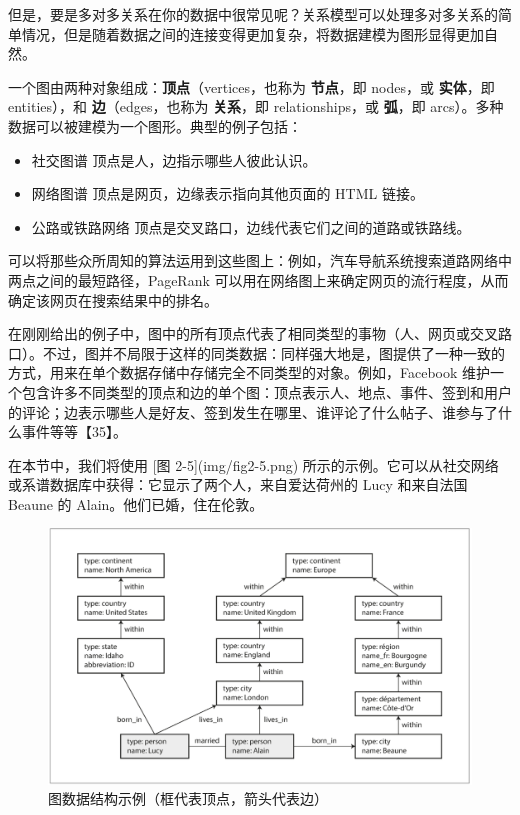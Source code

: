 但是，要是多对多关系在你的数据中很常见呢？关系模型可以处理多对多关系的简单情况，但是随着数据之间的连接变得更加复杂，将数据建模为图形显得更加自然。

一个图由两种对象组成：\textbf{顶点}（vertices，也称为 \textbf{节点}，即 nodes，或 \textbf{实体}，即 entities），和 \textbf{边}（edges，也称为 \textbf{关系}，即 relationships，或 \textbf{弧}，即 arcs）。多种数据可以被建模为一个图形。典型的例子包括：

\begin{itemize}
    \item 社交图谱
    顶点是人，边指示哪些人彼此认识。
    \item 网络图谱
    顶点是网页，边缘表示指向其他页面的 HTML 链接。
    \item 公路或铁路网络
    顶点是交叉路口，边线代表它们之间的道路或铁路线。
\end{itemize}

可以将那些众所周知的算法运用到这些图上：例如，汽车导航系统搜索道路网络中两点之间的最短路径，PageRank 可以用在网络图上来确定网页的流行程度，从而确定该网页在搜索结果中的排名。

在刚刚给出的例子中，图中的所有顶点代表了相同类型的事物（人、网页或交叉路口）。不过，图并不局限于这样的同类数据：同样强大地是，图提供了一种一致的方式，用来在单个数据存储中存储完全不同类型的对象。例如，Facebook 维护一个包含许多不同类型的顶点和边的单个图：顶点表示人、地点、事件、签到和用户的评论；边表示哪些人是好友、签到发生在哪里、谁评论了什么帖子、谁参与了什么事件等等【35】。

在本节中，我们将使用 [图 2-5](img/fig2-5.png) 所示的示例。它可以从社交网络或系谱数据库中获得：它显示了两个人，来自爱达荷州的 Lucy 和来自法国 Beaune 的 Alain。他们已婚，住在伦敦。

\begin{figure}
    \includegraphics{img/fig2-5.png}
    \caption{图数据结构示例（框代表顶点，箭头代表边）}
    \label{fig:fig2-5}
\end{figure}

